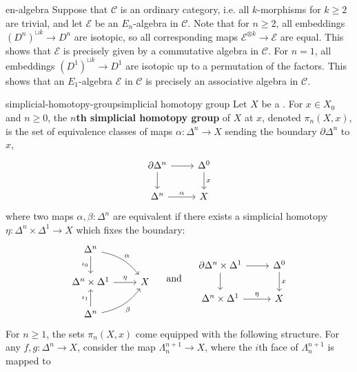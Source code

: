 \begin{example}{en-algebra}
    Suppose that $\mathcal{C}$ is an ordinary category, i.e. all $k$-morphisms for $k \ge 2$ are trivial, and let $\mathcal{E}$ be an $E_n$-algebra in $\mathcal{C}$. Note that for $n \ge 2$, all embeddings $(D^n)^{\sqcup k} \to D^n$ are isotopic, so all corresponding maps $\mathcal{E}^{\otimes k} \to \mathcal{E}$ are equal. This shows that $\mathcal{E}$ is precisely given by a commutative algebra in $\mathcal{C}$. For $n = 1$, all embeddings $(D^1)^{\sqcup k} \to D^1$ are isotopic up to a permutation of the factors. This shows that an $E_1$-algebra $\mathcal{E}$ in $\mathcal{C}$ is precisely an associative algebra in $\mathcal{C}$.
\end{example}

\begin{topic}{simplicial-homotopy-group}{simplicial homotopy group}
    Let $X$ be a .
    For $x \in X_0$ and $n \ge 0$, the \textbf{$n$th simplicial homotopy group} of $X$ at $x$, denoted $\pi_n(X, x)$, is the set of equivalence classes of maps $\alpha : \Delta^n \to X$ sending the boundary $\partial \Delta^n$ to $x$,
    \[ \begin{tikzcd} \partial \Delta^n \arrow{d} \arrow{r} & \Delta^0 \arrow{d}{x} \\ \Delta^n \arrow{r}{\alpha} & X \end{tikzcd} \]
    where two maps $\alpha, \beta : \Delta^n$ are equivalent if there exists a simplicial homotopy $\eta : \Delta^n \times \Delta^1 \to X$ which fixes the boundary:
    \[ \begin{tikzcd} \Delta^n \arrow[swap]{d}{\iota_0} \arrow[bend left=20]{dr}{\alpha} & \\ \Delta^n \times \Delta^1 \arrow{r}{\eta} & X \\ \Delta^n \arrow{u}{\iota_1} \arrow[swap, bend right=20]{ru}{\beta} \end{tikzcd} \quad \textup{ and } \quad \begin{tikzcd} \partial \Delta^n \times \Delta^1 \arrow{d} \arrow{r} & \Delta^0 \arrow{d}{x} \\ \Delta^n \times \Delta^1 \arrow{r}{\eta} & X \end{tikzcd} \]
    For $n \ge 1$, the sets $\pi_n(X, x)$ come equipped with the following  structure. For any $f, g : \Delta^n \to X$, consider the map $\Lambda^{n + 1}_n \to X$, where the $i$th face of $\Lambda^{n + 1}_n$ is mapped to

\end{topic}
